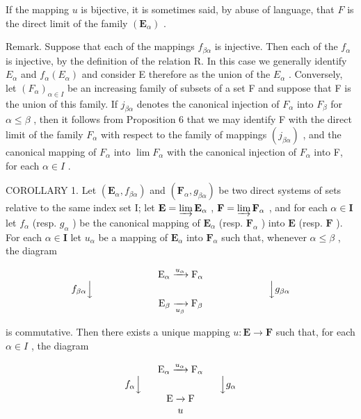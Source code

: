 If the mapping \(u\) is bijective, it is sometimes said, by abuse of language, that \(F\) is the direct limit of the family \((\mathbf{E}_{\alpha})\) .

Remark. Suppose that each of the mappings \(f_{\beta \alpha}\) is injective. Then each of the \(f_{\alpha}\) is injective, by the definition of the relation R. In this case we generally identify \(E_{\alpha}\) and \(f_{\alpha}(E_{\alpha})\) and consider E therefore as the union of the \(E_{\alpha}\) . Conversely, let \((F_{\alpha})_{\alpha \in I}\) be an increasing family of subsets of a set F and suppose that F is the union of this family. If \(j_{\beta \alpha}\) denotes the canonical injection of \(F_{\alpha}\) into \(F_{\beta}\) for \(\alpha \leqslant \beta\) , then it follows from Proposition 6 that we may identify F with the direct limit of the family \(F_{\alpha}\) with respect to the family of mappings \((j_{\beta \alpha})\) , and the canonical mapping of \(F_{\alpha}\) into \(\lim F_{\alpha}\) with the canonical injection of \(F_{\alpha}\) into F, for each \(\alpha \in I\) .

COROLLARY 1. Let \((\mathbf{E}_{\alpha}, f_{\beta \alpha})\) and \((\mathbf{F}_{\alpha}, g_{\beta \alpha})\) be two direct systems of sets relative to the same index set I; let \(\mathbf{E} = \varinjlim \mathbf{E}_{\alpha}\) , \(\mathbf{F} = \varinjlim \mathbf{F}_{\alpha}\) , and for each \(\alpha \in \mathbf{I}\) let \(f_{\alpha}\) (resp. \(g_{\alpha}\) ) be the canonical mapping of \(\mathbf{E}_{\alpha}\) (resp. \(\mathbf{F}_{\alpha}\) ) into \(\mathbf{E}\) (resp. \(\mathbf{F}\) ). For each \(\alpha \in \mathbf{I}\) let \(u_{\alpha}\) be a mapping of \(\mathbf{E}_{\alpha}\) into \(\mathbf{F}_{\alpha}\) such that, whenever \(\alpha \leqslant \beta\) , the diagram

\[
\begin{array}{c} \mathrm{E} _ {\alpha} \xrightarrow {u _ {\alpha}} \mathrm{F} _ {\alpha} \\ f _ {\beta \alpha} \Big \downarrow \qquad \qquad \qquad \qquad \qquad \qquad \qquad \qquad \qquad \Big \downarrow g _ {\beta \alpha} \\ \mathrm{E} _ {\beta} \xrightarrow [ u _ {\beta} ]{} \mathrm{F} _ {\beta} \end{array}
\]

is commutative. Then there exists a unique mapping \(u: \mathbf{E} \to \mathbf{F}\) such that, for each \(\alpha \in I\) , the diagram

\[
\begin{array}{c} \mathrm{E} _ {\alpha} \xrightarrow {u _ {\alpha}} \mathrm{F} _ {\alpha} \\ f _ {\alpha} \Big \downarrow \qquad \qquad \qquad \qquad \Big \downarrow g _ {\alpha} \\ \mathrm{E} \xrightarrow {} \mathrm{F} \\ u \end{array}
\]


